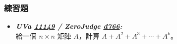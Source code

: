 \subsubsection*{練習題}
\begin{itemize}[label={\Checkmark}]
\item \textbf{\textit{UVa \href{http://uva.onlinejudge.org/external/111/11149.html}{11149} / ZeroJudge \href{http://zerojudge.tw/ShowProblem?problemid=d766}{d766}: }}\\
給一個 $n\times{n}$ 矩陣 $A$，計算 $A+A^2+A^3+\cdots{}+A^k$。
\end{itemize}